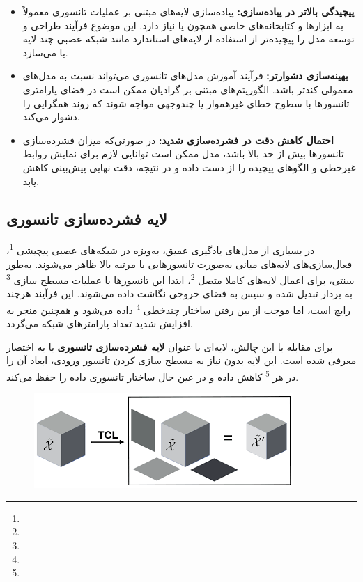 \begin{itemize}
	\item \textbf{پیچیدگی بالاتر در پیاده‌سازی:} پیاده‌سازی لایه‌های مبتنی بر عملیات تانسوری معمولاً به ابزارها و کتابخانه‌های خاصی همچون  یا  نیاز دارد. این موضوع فرآیند طراحی و توسعه مدل را پیچیده‌تر از استفاده از لایه‌های استاندارد مانند شبکه عصبی چند لایه  یا  می‌سازد.
	
	\item \textbf{بهینه‌سازی دشوارتر:} فرآیند آموزش مدل‌های تانسوری می‌تواند نسبت به مدل‌های معمولی کندتر باشد. الگوریتم‌های مبتنی بر گرادیان ممکن است در فضای پارامتری تانسورها با سطوح خطای غیرهموار یا چندوجهی مواجه شوند که روند همگرایی را دشوار می‌کند.
	
	\item \textbf{احتمال کاهش دقت در فشرده‌سازی شدید:} در صورتی‌که میزان فشرده‌سازی تانسورها بیش از حد بالا باشد، مدل ممکن است توانایی لازم برای نمایش روابط غیرخطی و الگوهای پیچیده را از دست داده و در نتیجه، دقت نهایی پیش‌بینی کاهش یابد.
\end{itemize}



\subsection{لایه فشرده‌سازی تانسوری}



در بسیاری از مدل‌های یادگیری عمیق، به‌ویژه در شبکه‌های عصبی پیچیشی \footnote{}، فعال‌سازی‌های لایه‌های میانی به‌صورت تانسورهایی با مرتبه بالا ظاهر می‌شوند. به‌طور سنتی، برای اعمال لایه‌های کاملا متصل \footnote{}، ابتدا این تانسورها با عملیات مسطح سازی \footnote{} به بردار تبدیل شده و سپس به فضای خروجی نگاشت داده می‌شوند. این فرآیند هرچند رایج است، اما موجب از بین رفتن ساختار چندخطی \footnote{} داده می‌شود و همچنین منجر به افزایش شدید تعداد پارامترهای شبکه می‌گردد.

برای مقابله با این چالش، لایه‌ای با عنوان \textbf{لایه فشرده‌سازی تانسوری} یا به اختصار  معرفی شده است. این لایه بدون نیاز به مسطح سازی کردن تانسور ورودی، ابعاد آن را در هر \footnote{} کاهش داده و در عین حال ساختار تانسوری داده را حفظ می‌کند.


\begin{figure}[h]
	\centering
	\begin{minipage}[b]{0.7\textwidth}
		\centering
		\includegraphics[width=\textwidth]{transformer_images/tcl.png}
		\caption{}
		\label{fig:tensor_contraction_layer}
	\end{minipage}
	\hfill
\end{figure}




